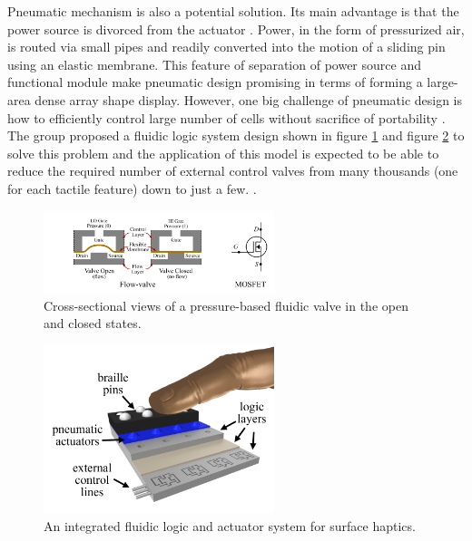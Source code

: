 Pneumatic mechanism is also a potential solution.
Its main advantage is that the power source is divorced from the actuator \cite{russomanno_design_2015}.
Power, in the form of pressurized air, is routed via small pipes and readily converted into the motion of a sliding pin using an elastic membrane.
This feature of separation of power source and functional module make pneumatic design promising in terms of forming a large-area dense array shape display.
However, one big challenge of pneumatic design is how to efficiently control large number of cells without sacrifice of portability \cite{russomanno_model-based_2017}.
The group proposed a fluidic logic system design shown in figure \ref{fig:pneumatic-schema} and figure \ref{fig:Integrated fluidic logic system} to solve this problem and the application of this model is expected to be able to reduce the required number of external control valves from many thousands (one for each tactile feature) down to just a few. \cite{russomanno_design_2015}.

\begin{figure}[ht]\centering
    \includegraphics[width=0.6\textwidth]{figures/pneumatic-schema.png}
\caption{Cross-sectional views of a pressure-based fluidic valve in the open and closed states.}
\label{fig:pneumatic-schema}
\end{figure}
\begin{figure}[ht]\centering
    \includegraphics[width=0.6\textwidth]{figures/fluidic logic system.png}
\caption{An integrated fluidic logic and actuator system for surface haptics.}
\label{fig:Integrated fluidic logic system}
\end{figure}

